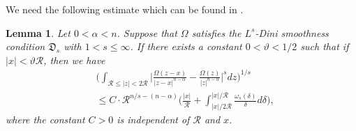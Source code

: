 \documentclass[preprint,10pt]{elsarticle}
\newtheorem{lem}[thm]{Lemma}
\numberwithin{equation}{section}
\begin{document}
We need the following estimate which can be found in \cite[Lemma 1]{ding2}.

\begin{lem}\label{lem1}
Let $0<\alpha<n$. Suppose that $\Omega$ satisfies the $L^s$-Dini smoothness condition $\mathfrak{D}_{s}$ with $1<s\le\infty$. If there exists a constant $0<\vartheta<1/2$ such that if $|x|<\vartheta \mathcal{R}$, then we have
\begin{equation*}
\begin{split}
&\bigg(\int_{\mathcal{R}\leq|z|<2\mathcal{R}}
\bigg|\frac{\Omega(z-x)}{|z-x|^{n-\alpha}}-\frac{\Omega(z)}{|z|^{n-\alpha}}\bigg|^sdz\bigg)^{1/s}\\
&\leq C\cdot \mathcal{R}^{n/s-(n-\alpha)}\bigg(\frac{|x|}{\mathcal{R}}
+\int_{|x|/{2\mathcal{R}}}^{|x|/\mathcal{R}}\frac{\omega_{s}(\delta)}{\delta}d\delta\bigg),
\end{split}
\end{equation*}
where the constant $C>0$ is independent of $\mathcal{R}$ and $x$.
\end{lem}
\end{document}
